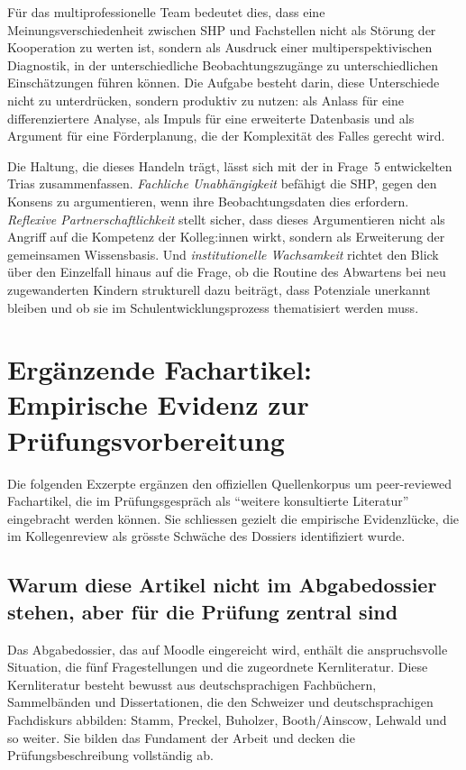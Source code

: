 \documentclass[ngerman, a4paper]{article}
\begin{document}
Für das multiprofessionelle Team bedeutet dies, dass eine Meinungsverschiedenheit
zwischen SHP und Fachstellen nicht als Störung der Kooperation zu werten ist,
sondern als Ausdruck einer multiperspektivischen Diagnostik, in der
unterschiedliche Beobachtungszugänge zu unterschiedlichen Einschätzungen
führen können. Die Aufgabe besteht darin, diese Unterschiede nicht zu
unterdrücken, sondern produktiv zu nutzen: als Anlass für eine differenziertere
Analyse, als Impuls für eine erweiterte Datenbasis und als Argument für eine
Förderplanung, die der Komplexität des Falles gerecht wird.

Die Haltung, die dieses Handeln trägt, lässt sich mit der in Frage~5
entwickelten Trias zusammenfassen. \textit{Fachliche Unabhängigkeit} befähigt
die SHP, gegen den Konsens zu argumentieren, wenn ihre Beobachtungsdaten dies
erfordern. \textit{Reflexive Partnerschaftlichkeit} stellt sicher, dass dieses
Argumentieren nicht als Angriff auf die Kompetenz der Kolleg:innen wirkt,
sondern als Erweiterung der gemeinsamen Wissensbasis. Und
\textit{institutionelle Wachsamkeit} richtet den Blick über den Einzelfall
hinaus auf die Frage, ob die Routine des Abwartens bei neu zugewanderten
Kindern strukturell dazu beiträgt, dass Potenziale unerkannt bleiben und
ob sie im Schulentwicklungsprozess thematisiert werden muss.


\newpage
\section*{Ergänzende Fachartikel: Empirische Evidenz zur Prüfungsvorbereitung}
\label{sec:fachartikel}

Die folgenden Exzerpte ergänzen den offiziellen Quellenkorpus um
peer-reviewed Fachartikel, die im Prüfungsgespräch als \enquote{weitere
  konsultierte Literatur} eingebracht werden können. Sie schliessen gezielt
die empirische Evidenzlücke, die im Kollegenreview als grösste Schwäche
des Dossiers identifiziert wurde.

\subsection*{Warum diese Artikel nicht im Abgabedossier stehen, aber für die Prüfung zentral sind}

Das Abgabedossier, das auf Moodle eingereicht wird, enthält die anspruchsvolle Situation,
die fünf Fragestellungen und die zugeordnete Kernliteratur. Diese Kernliteratur besteht
bewusst aus deutschsprachigen Fachbüchern, Sammelbänden und Dissertationen, die den
Schweizer und deutschsprachigen Fachdiskurs abbilden: Stamm, Preckel, Buholzer,
Booth/Ainscow, Lehwald und so weiter. Sie bilden das Fundament der Arbeit und decken die
Prüfungsbeschreibung vollständig ab.
\end{document}

